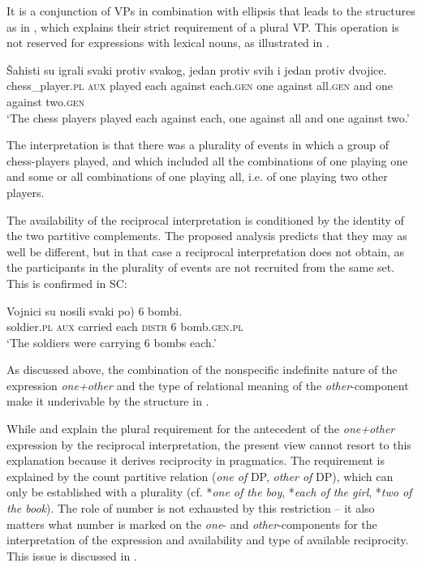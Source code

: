 \documentclass[output=paper,colorlinks,citecolor=brown]{langscibook}
\begin{document}
\noindent It is a conjunction of VPs in combination with ellipsis that leads to the structures as in , which explains their strict requirement of a plural VP. This operation is not reserved for expressions with lexical nouns, as illustrated in .

\ea\label{Šahisti3} \gll Šahisti su igrali svaki protiv svakog, jedan protiv svih i jedan protiv dvojice.\\
 chess\_player.\textsc{pl} \textsc{aux} played each against each.\textsc{gen} one against all.\textsc{gen} and one against two.\textsc{gen}\\
\glt `The chess players played each against each, one against all and one against two.'
 \z

\noindent The interpretation is that there was a plurality of events in which a group of chess-players played, and which included all the combinations of one playing one and some or all combinations of one playing all, i.e. of one playing two other players.

The availability of the reciprocal interpretation is conditioned by the identity of the two partitive complements. The proposed analysis predicts that they may as well be different, but in that case a reciprocal interpretation does not obtain, as the participants in the plurality of events are not recruited from the same set. This is confirmed in SC:

\ea\label{Vojnici3} \gll Vojnici su nosili svaki \minsp{(} po) 6 bombi.\\
 soldier.\textsc{pl} \textsc{aux} carried each {} \textsc{distr} 6 bomb.\textsc{gen.pl}\\
 \glt `The soldiers were carrying 6 bombs each.'
\z

\noindent As discussed above, the combination of the nonspecific indefinite nature of the expression \textit{one+other} and the type of relational meaning of the \textit{other}-component make it underivable by the structure in .

While \citet{v10} and \citet{z14} explain the plural requirement for the antecedent of the \textit{one+other} expression by the reciprocal interpretation, the present view cannot resort to this explanation because it derives reciprocity in pragmatics. The requirement is explained by the count partitive relation (\textit{one of} DP, \textit{other of} DP), which can only be established with a plurality (cf. *\textit{one of the boy}, *\textit{each of the girl},\textit{ }*\textit{two of the book}). The role of number is not exhausted by this restriction -- it also matters what number is marked on the \textit{one}- and \textit{other}-components for the interpretation of the expression and availability and type of available reciprocity. This issue is discussed in .
\end{document}
